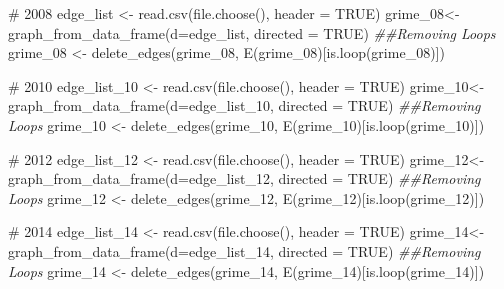 \documentclass[
  letterpaper,
  DIV=11,
  numbers=noendperiod]{scrreprt}
\newenvironment{Shaded}{\begin{snugshade}}{\end{snugshade}}
\newcommand{\AttributeTok}[1]{\textcolor[rgb]{0.40,0.45,0.13}{#1}}
\newcommand{\CommentTok}[1]{\textcolor[rgb]{0.37,0.37,0.37}{#1}}
\newcommand{\ConstantTok}[1]{\textcolor[rgb]{0.56,0.35,0.01}{#1}}
\newcommand{\DocumentationTok}[1]{\textcolor[rgb]{0.37,0.37,0.37}{\textit{#1}}}
\newcommand{\FunctionTok}[1]{\textcolor[rgb]{0.28,0.35,0.67}{#1}}
\newcommand{\NormalTok}[1]{\textcolor[rgb]{0.00,0.23,0.31}{#1}}
\newcommand{\OtherTok}[1]{\textcolor[rgb]{0.00,0.23,0.31}{#1}}
\begin{document}
\begin{Shaded}
\begin{Highlighting}[]
\CommentTok{\# 2008}
\NormalTok{edge\_list }\OtherTok{\textless{}{-}} \FunctionTok{read.csv}\NormalTok{(}\FunctionTok{file.choose}\NormalTok{(), }\AttributeTok{header =} \ConstantTok{TRUE}\NormalTok{)}
\NormalTok{grime\_08}\OtherTok{\textless{}{-}} \FunctionTok{graph\_from\_data\_frame}\NormalTok{(}\AttributeTok{d=}\NormalTok{edge\_list, }\AttributeTok{directed =} \ConstantTok{TRUE}\NormalTok{)}
\DocumentationTok{\#\#Removing Loops}
\NormalTok{grime\_08 }\OtherTok{\textless{}{-}} \FunctionTok{delete\_edges}\NormalTok{(grime\_08, }\FunctionTok{E}\NormalTok{(grime\_08)[}\FunctionTok{is.loop}\NormalTok{(grime\_08)])}


\CommentTok{\# 2010}
\NormalTok{edge\_list\_10 }\OtherTok{\textless{}{-}} \FunctionTok{read.csv}\NormalTok{(}\FunctionTok{file.choose}\NormalTok{(), }\AttributeTok{header =} \ConstantTok{TRUE}\NormalTok{)}
\NormalTok{grime\_10}\OtherTok{\textless{}{-}} \FunctionTok{graph\_from\_data\_frame}\NormalTok{(}\AttributeTok{d=}\NormalTok{edge\_list\_10, }\AttributeTok{directed =} \ConstantTok{TRUE}\NormalTok{)}
\DocumentationTok{\#\#Removing Loops}
\NormalTok{grime\_10 }\OtherTok{\textless{}{-}} \FunctionTok{delete\_edges}\NormalTok{(grime\_10, }\FunctionTok{E}\NormalTok{(grime\_10)[}\FunctionTok{is.loop}\NormalTok{(grime\_10)])}

\CommentTok{\# 2012}
\NormalTok{edge\_list\_12 }\OtherTok{\textless{}{-}} \FunctionTok{read.csv}\NormalTok{(}\FunctionTok{file.choose}\NormalTok{(), }\AttributeTok{header =} \ConstantTok{TRUE}\NormalTok{)}
\NormalTok{grime\_12}\OtherTok{\textless{}{-}} \FunctionTok{graph\_from\_data\_frame}\NormalTok{(}\AttributeTok{d=}\NormalTok{edge\_list\_12, }\AttributeTok{directed =} \ConstantTok{TRUE}\NormalTok{)}
\DocumentationTok{\#\#Removing Loops}
\NormalTok{grime\_12 }\OtherTok{\textless{}{-}} \FunctionTok{delete\_edges}\NormalTok{(grime\_12, }\FunctionTok{E}\NormalTok{(grime\_12)[}\FunctionTok{is.loop}\NormalTok{(grime\_12)])}

\CommentTok{\# 2014}
\NormalTok{edge\_list\_14 }\OtherTok{\textless{}{-}} \FunctionTok{read.csv}\NormalTok{(}\FunctionTok{file.choose}\NormalTok{(), }\AttributeTok{header =} \ConstantTok{TRUE}\NormalTok{)}
\NormalTok{grime\_14}\OtherTok{\textless{}{-}} \FunctionTok{graph\_from\_data\_frame}\NormalTok{(}\AttributeTok{d=}\NormalTok{edge\_list\_14, }\AttributeTok{directed =} \ConstantTok{TRUE}\NormalTok{)}
\DocumentationTok{\#\#Removing Loops}
\NormalTok{grime\_14 }\OtherTok{\textless{}{-}} \FunctionTok{delete\_edges}\NormalTok{(grime\_14, }\FunctionTok{E}\NormalTok{(grime\_14)[}\FunctionTok{is.loop}\NormalTok{(grime\_14)])}
\end{Highlighting}
\end{Shaded}
\end{document}
